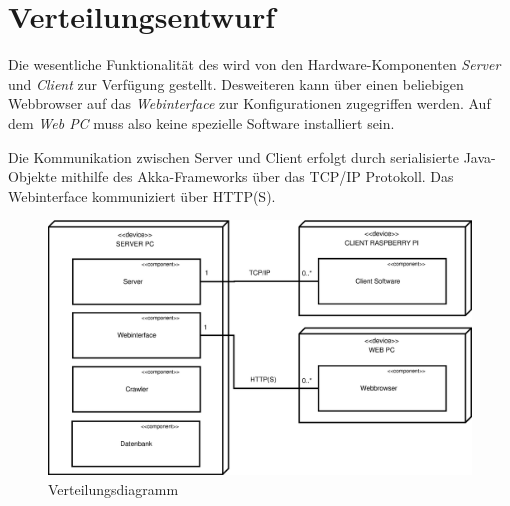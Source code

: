 
\chapter{Verteilungsentwurf}

Die wesentliche Funktionalität des \NewsGenie wird von den Hardware-Komponenten
\textit{Server} und \textit{Client} zur Verfügung gestellt. Desweiteren kann
über einen beliebigen Webbrowser auf das \textit{Webinterface} zur
Konfigurationen zugegriffen werden. Auf dem \textit{Web PC} muss also keine
spezielle Software installiert sein.

Die Kommunikation zwischen Server und Client erfolgt durch serialisierte
Java-Objekte mithilfe des Akka-Frameworks über das TCP/IP Protokoll. Das
Webinterface kommuniziert über HTTP(S).

\begin{figure}[h]
\centering
\includegraphics[width=1\textwidth]{Systementwurf/04_verteilungsentwurf/verteilungsentwurf.eps}
\caption{Verteilungsdiagramm}
\end{figure}